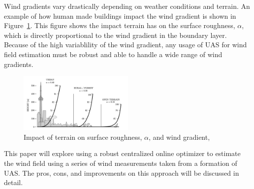 Wind gradients vary drastically depending on weather conditions and terrain. An example of how human made buildings impact the wind gradient is shown in Figure~\ref{fig:wind_gradient_buildings}. 
This figure shows the impact terrain has on the surface roughness, $\alpha$, which is directly proportional to the wind gradient in the boundary layer.
Because of the high variablility of the wind gradient, any usage of UAS for wind field estimation must be robust and able to handle a wide range of wind gradients.

\begin{figure}[h]
    \centering
    \includegraphics[width=0.5\textwidth]{images/wind_gradient_buildings.png}
    \caption{Impact of terrain on surface roughness, $\alpha$, and wind gradient, \cite{recoskie2017}}
    \label{fig:wind_gradient_buildings}
\end{figure}

This paper will explore using a robust centralized online optimizer to estimate the wind field using a series of wind measurements taken from a formation of UAS.
The pros, cons, and improvements on this approach will be discussed in detail.